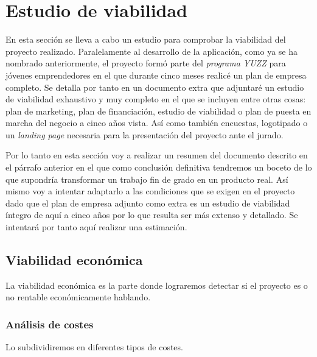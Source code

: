 \section{Estudio de viabilidad}\label{estudio-viabilidad}
En esta sección se lleva a cabo un estudio para comprobar la viabilidad del proyecto realizado. Paralelamente al desarrollo de la aplicación, como ya se ha nombrado anteriormente, el proyecto formó parte del \emph{programa YUZZ } para jóvenes emprendedores en el que durante cinco meses realicé un plan de empresa completo. Se detalla por tanto en un documento extra que adjuntaré un estudio de viabilidad exhaustivo  y muy completo en el que se incluyen entre otras cosas: plan de marketing, plan de financiación, estudio de viabilidad o plan de puesta en marcha del negocio a cinco años vista. Así como también encuestas, logotipado o un \emph{landing page} necesaria para la presentación del proyecto ante el jurado. 

Por lo tanto en esta sección voy a realizar un resumen del documento descrito en el párrafo anterior en el que como conclusión definitiva tendremos un boceto de lo que supondría transformar un  trabajo fin de grado en un producto real. Así mismo voy a intentar adaptarlo a las condiciones que se exigen en el proyecto dado que el plan de empresa adjunto como extra es un estudio de viabilidad íntegro de aquí a cinco años por lo que resulta ser más extenso y detallado. Se intentará por tanto aquí realizar una estimación.

\subsection{Viabilidad económica}\label{viabilidad-economica}

La viabilidad económica es la parte donde lograremos detectar si el proyecto es o no rentable económicamente hablando.

\subsubsection{Análisis de costes}\label{costes}

Lo subdividiremos en diferentes tipos de costes.

